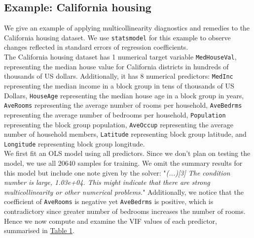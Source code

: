 \documentclass[12pt]{article}
\begin{document}
	\subsection{Example: California housing\label{sec:4.4}}
	We give an example of applying multicollinearity diagnostics and remedies to the California housing dataset. We use \texttt{statsmodel} for this example to observe changes reflected in standard errors of regression coefficients. \\
	
	The California housing dataset has 1 numerical target variable \texttt{MedHouseVal}, representing the median house value for California districts in hundreds of thousands of US dollars. Additionally, it has 8 numerical predictors: \texttt{MedInc} representing the median income in a block group in tens of thousands of US Dollars, \texttt{HouseAge} representing the median house age in a block group in years, \texttt{AveRooms} representing the average number of rooms per household, \texttt{AveBedrms} representing the average number of bedrooms per household, \texttt{Population} representing the block group population, \texttt{AveOccup} representing the average number of household members, \texttt{Latitude} representing block group latitude, and \texttt{Longitude} representing block group longitude. \\
	
	We first fit an OLS model using all predictors. Since we don't plan on testing the model, we use all 20640 samples for training. We omit the summary results for this model but include one note given by the solver: "\textit{(...)[3] The condition number is large, 1.03e+04. This might indicate that there are strong multicollinearity or other numerical problems.}" Additionally, we notice that the coefficient of \texttt{AveRooms} is negative yet \texttt{AveBedrms} is positive, which is contradictory since greater number of bedrooms increases the number of rooms. Hence we now compute and examine the VIF values of each predictor, summarised in \hyperref[tab:Table1]{Table 1}.
	
\end{document}
